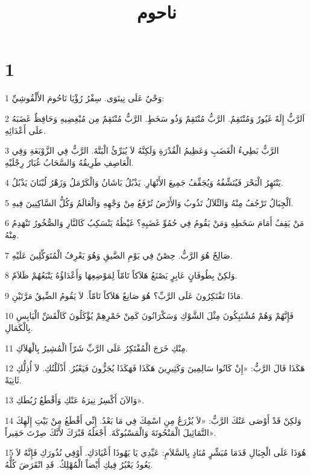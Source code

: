 

\title{ناحوم}


\chapter{1}

\par 1 وَحْيٌ عَلَى نِينَوَى. سِفْرُ رُؤْيَا نَاحُومَ الأَلْقُوشِيِّ:
\par 2 اَلرَّبُّ إِلَهٌ غَيُورٌ وَمُنْتَقِمٌ. الرَّبُّ مُنْتَقِمٌ وَذُو سَخَطٍ. الرَّبُّ مُنْتَقِمٌ مِن مُبْغِضِيهِ وَحَافِظٌ غَضَبَهُ علَى أَعْدَائِهِ.
\par 3 الرَّبُّ بَطِيءُ الْغَضَبِ وَعَظِيمُ الْقُدْرَةِ وَلَكِنَّهُ لاَ يُبَرِّئُ الْبَتَّةَ. الرَّبُّ فِي الزَّوْبَعَةِ وَفِي الْعَاصِفِ طَرِيقُهُ وَالسَّحَابُ غُبَارُ رِجْلَيْهِ.
\par 4 يَنْتَهِرُ الْبَحْرَ فَيُنَشِّفُهُ وَيُجَفِّفُ جَمِيعَ الأَنْهَارِ. يَذْبُلُ بَاشَانُ وَالْكَرْمَلُ وَزَهْرُ لُبْنَانَ يَذْبُلُ.
\par 5 اَلْجِبَالُ تَرْجُفُ مِنْهُ وَالتِّلاَلُ تَذُوبُ وَالأَرْضُ تُرْفَعُ مِنْ وَجْهِهِ وَالْعَالَمُ وَكُلُّ السَّاكِنِينَ فِيهِ.
\par 6 مَنْ يَقِفُ أَمَامَ سَخَطِهِ وَمَنْ يَقُومُ فِي حُمُوِّ غَضَبِهِ؟ غَيْظُهُ يَنْسَكِبُ كَالنَّارِ وَالصُّخُورُ تَنْهَدِمُ مِنْهُ.
\par 7 صَالِحٌ هُوَ الرَّبُّ. حِصْنٌ فِي يَوْمِ الضَّيقِ وَهُوَ يَعْرِفُ الْمُتَوَكِّلِينَ عَلَيْهِ.
\par 8 وَلكِنْ بِطُوفَانٍ عَابِرٍ يَصْنَعُ هَلاَكاً تَامّاً لِمَوْضِعِهَا وَأَعْدَاؤُهُ يَتْبَعُهُمْ ظَلاَمٌ.
\par 9 مَاذَا تَفْتَكِرُونَ عَلَى الرَّبِّ؟ هُوَ صَانِعٌ هَلاَكاً تَامّاً. لاَ يَقُومُ الضِّيقُ مَرَّتَيْنِ.
\par 10 فَإِنَّهُمْ وَهُمْ مُشْتَبِكُونَ مِثْلَ الشَّوْكِ وَسَكْرَانُونَ كَمِنْ خَمْرِهِمْ يُؤْكَلُونَ كَالْقَشِّ الْيَابِسِ بِالْكَمَالِ.
\par 11 مِنْكِ خَرَجَ الْمُفْتَكِرُ عَلَى الرَّبِّ شَرّاً الْمُشِيرُ بِالْهَلاَكِ.
\par 12 هَكَذَا قَالَ الرَّبُّ: «إِنْ كَانُوا سَالِمِينَ وَكَثِيرِينَ هَكَذَا فَهَكَذَا يُجَزُّونَ فَيَعْبُرُ. أَذْلَلْتُكِ. لاَ أُذِلُّكِ ثَانِيَةً.
\par 13 وَالآنَ أَكْسِرُ نِيرَهُ عَنْكِ وَأَقْطَعُ رُبُطَكِ».
\par 14 وَلكِنْ قَدْ أَوْصَى عَنْكَ الرَّبُّ: «لاَ يُزْرَعُ مِنِ اسْمِكَ فِي مَا بَعْدُ. إِنِّي أَقْطَعُ مِنْ بَيْتِ إِلَهِكَ التَّمَاثِيلَ الْمَنْحُوتَةَ وَالْمَسْبُوكَةَ. أَجْعَلُهُ قَبْرَكَ لأَنَّكَ صِرْتَ حَقِيراً».
\par 15 هُوَذَا عَلَى الْجِبَالِ قَدَمَا مُبَشِّرٍ مُنَادٍ بِالسَّلاَمِ: عَيِّدِي يَا يَهُوذَا أَعْيَادَكِ. أَوْفِي نُذُورَكِ فَإِنَّهُ لاَ يَعُودُ يَعْبُرُ فِيكِ أَيْضاً الْمُهْلِكُ. قَدِ انْقَرَضَ كُلُّهُ.

